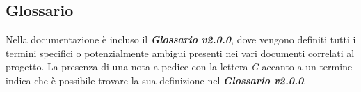 \subsection{Glossario}
Nella documentazione è incluso il \textbf{\textit{Glossario v2.0.0}}, dove vengono definiti tutti i termini specifici o potenzialmente ambigui presenti nei vari documenti correlati al progetto. La presenza di una nota a pedice con la lettera \textit{G} accanto a un termine indica che è possibile trovare la sua definizione nel \textbf{\textit{Glossario v2.0.0}}.  
